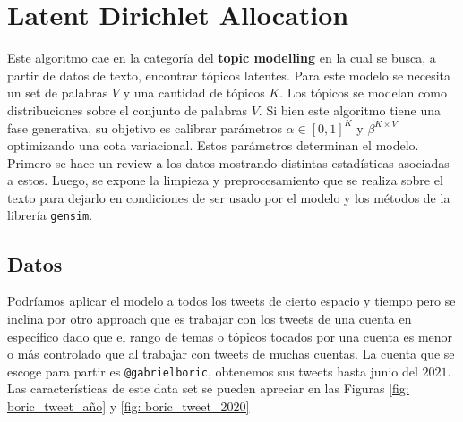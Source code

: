 \documentclass{article}
\begin{document}
\newpage

\section{Latent Dirichlet Allocation}
	Este algoritmo cae en la categoría del \textbf{topic modelling} en la cual se busca, a partir de datos de texto, encontrar tópicos latentes. Para este modelo se necesita un set de palabras $V$ y una cantidad de tópicos $K$. Los tópicos se modelan como distribuciones sobre el conjunto de palabras $V$. Si bien este algoritmo tiene una fase generativa, su objetivo es calibrar parámetros $\alpha\in [0,1]^{K}$ y $\beta^{K\times V}$ optimizando una cota variacional. Estos parámetros determinan el modelo.\\
	
	Primero se hace un review a los datos mostrando distintas estadísticas asociadas a estos. Luego, se expone la limpieza y preprocesamiento que se realiza sobre el texto para dejarlo en condiciones de ser usado por el modelo y los métodos de la librería \texttt{gensim}. 
	
\subsection{Datos}
	Podríamos aplicar el modelo a todos los tweets de cierto espacio y tiempo pero se inclina por otro approach que es trabajar con los tweets de una cuenta en específico dado que el rango de temas o tópicos tocados por una cuenta es menor o más controlado que al trabajar con tweets de muchas cuentas. La cuenta que se escoge para partir es \texttt{@gabrielboric}, obtenemos sus tweets hasta junio del $2021$. Las características de este data set se pueden apreciar en las Figuras \ref{fig: boric_tweet_año} y \ref{fig: boric_tweet_2020}

	
	
\end{document}
